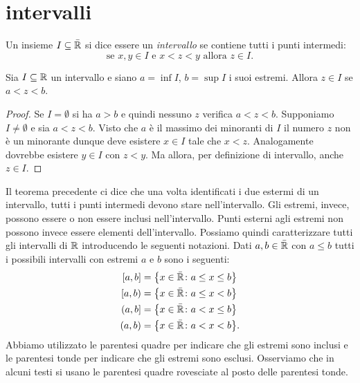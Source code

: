 \section{intervalli}

\begin{definition}[intervallo]
\label{def:intervallo}%
%
Un insieme $I\subseteq \bar{\mathbb R}$ si dice essere un \emph{intervallo}
se contiene tutti i punti intermedi:
\[
  \text{se $x, y \in I$ e $x<z<y$ allora $z \in I$.}
\]
\end{definition}
%
\begin{theorem}
Sia $I\subseteq \mathbb R$ un intervallo e siano $a=\inf I$, $b=\sup I$
i suoi estremi. Allora
$z\in I$ se $a < z < b$.
\end{theorem}
%
\begin{proof}
Se $I=\emptyset$ si ha $a>b$ e quindi nessuno $z$ verifica $a<z<b$.
Supponiamo $I\neq \emptyset$ e
sia $a < z < b$.
Visto che $a$ è il massimo dei minoranti di $I$
il numero $z$ non è un minorante dunque
deve esistere $x \in I$ tale
che $x < z$. Analogamente dovrebbe esistere $y\in I$
con $z<y$.
Ma allora, per definizione di intervallo, anche $z\in I$.
\end{proof}

Il teorema precedente ci dice che una volta identificati i due estermi
di un intervallo, tutti i punti intermedi devono stare nell'intervallo.
Gli estremi, invece, possono essere o non essere inclusi nell'intervallo.
Punti esterni agli estremi non possono invece essere elementi dell'intervallo.
Possiamo quindi caratterizzare tutti gli intervalli di $\mathbb R$
introducendo le seguenti notazioni. Dati $a,b\in \bar {\mathbb R}$ con $a\le b$
tutti i possibili intervalli con estremi $a$ e $b$ sono i seguenti:
\begin{equation}\label{eq:499494}
\begin{aligned}
[a,b] &= \ENCLOSE{x\in \bar \RR\colon a \le x \le b} \\
[a,b) &= \ENCLOSE{x\in \bar \RR\colon a \le x < b} \\
(a,b] &= \ENCLOSE{x\in \bar \RR\colon a < x \le b}\\
(a,b) &= \ENCLOSE{x\in \bar \RR\colon a < x < b}.
\end{aligned}
\end{equation}
Abbiamo utilizzato le parentesi quadre per indicare che gli estremi
sono inclusi e le parentesi tonde per indicare che gli estremi sono esclusi.
Osserviamo che in alcuni testi si usano le parentesi quadre rovesciate al posto
delle parentesi tonde.

